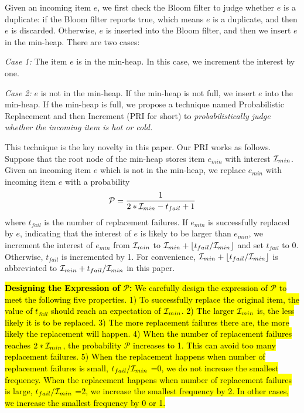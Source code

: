 Given an incoming item $e$, we first check the Bloom filter to judge whether $e$ is a duplicate: if the Bloom filter reports true, which means $e$ is a duplicate, and then $e$ is discarded. Otherwise, $e$ is inserted into the Bloom filter, and then we insert $e$ in the min-heap. There are two cases:

\textit{Case 1:} The item $e$ is in the min-heap. In this case, we increment the interest \ii{} by one.

\textit{Case 2:} $e$ is not in the min-heap. If the min-heap is not full, we insert $e$ into the min-heap. If the min-heap is full, we propose a technique named Probabilistic Replacement and then Increment (PRI for short) to \textit{probabilistically judge whether the incoming item is hot or cold.}

 This technique is the key novelty in this paper. Our PRI works as follows.
Suppose that the root node of the min-heap stores item $e_{min}$ with interest $\mathcal{I}_{min}$.
Given an incoming item $e$ which is not in the min-heap, we replace $e_{min}$ with incoming item $e$ with a probability
%
$$\mathcal{P}=\frac{1}{2*\mathcal{I}_{min}-
t_{fail}+1}$$
where $t_{fail}$ is the number of replacement failures.
%
If $e_{min}$ is successfully replaced by $e$, indicating that the interest of $e$ is likely to be larger than $e_{min}$, we increment the interest of $e_{min}$ from $\mathcal{I}_{min}$ to $\mathcal{I}_{min}+\lfloor t_{fail}/\mathcal{I}_{min}\rfloor$ and set $t_{fail}$ to 0. 
%
Otherwise, $t_{fail}$ is incremented by 1.
%
For convenience, $\mathcal{I}_{min}+\lfloor t_{fail}/\mathcal{I}_{min}\rfloor$ is abbreviated to  $\mathcal{I}_{min}+ t_{fail}/\mathcal{I}_{min}$ in this paper.

{\color{reviewD}\hl{
\noindent\textbf{Designing the Expression of $\mathcal{P}$:}
We carefully design the expression of $\mathcal{P}$ to meet the following five properties. 
1) To successfully replace the original item, the value of $t_{fail}$ should reach an expectation of $\mathcal{I}_{min}$.
%
2) The larger $\mathcal{I}_{min}$ is, the less likely it is to be replaced.
3) The more replacement failures there are, the more likely the replacement will happen. 
4) When the number of replacement failures reaches $2*\mathcal{I}_{min}$, the probability $\mathcal{P}$ increases to 1. This can avoid too many replacement failures.
5) When the replacement happens when number of replacement failures is small, $t_{fail}/\mathcal{I}_{min}$ =0, we do not increase the smallest frequency. When the replacement happens when number of replacement failures is large, $t_{fail}/\mathcal{I}_{min}$ =2, we increase the smallest frequency by 2. In other cases, we increase the smallest frequency by 0 or 1. 
}}


